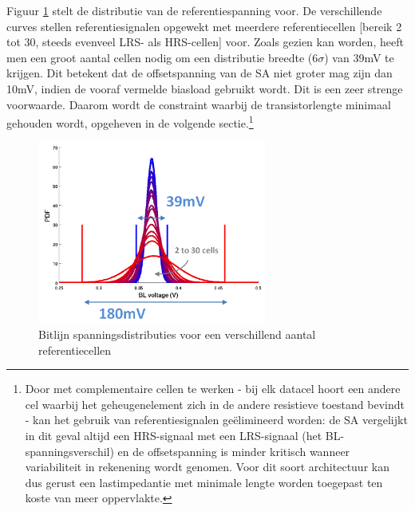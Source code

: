 Figuur \ref{fig:distref} stelt de distributie van de referentiespanning voor. De verschillende curves stellen referentiesignalen opgewekt met meerdere referentiecellen [bereik 2 tot 30, steeds evenveel LRS- als HRS-cellen] voor. Zoals gezien kan worden, heeft men een groot aantal cellen nodig om een distributie breedte (6$\sigma$) van 39mV te krijgen. Dit betekent dat de offsetspanning van de SA niet groter mag zijn dan 10mV, indien de vooraf vermelde biasload gebruikt wordt. Dit is een zeer strenge voorwaarde. Daarom wordt de constraint waarbij de transistorlengte minimaal gehouden wordt, opgeheven in de volgende sectie.\footnote{Door met complementaire cellen te werken - bij elk datacel hoort een andere cel waarbij het geheugenelement zich in de andere resistieve toestand bevindt - kan het gebruik van referentiesignalen geëlimineerd worden: de SA vergelijkt in dit geval altijd een HRS-signaal met een LRS-signaal (het BL-spanningsverschil) en de offsetspanning is minder kritisch wanneer variabiliteit in rekenening wordt genomen. Voor dit soort architectuur kan dus gerust een lastimpedantie met minimale lengte worden toegepast ten koste van meer oppervlakte.}

\begin{figure}[!ht]
  \centering
  \includegraphics[width=0.67\textwidth]{../fig/hfdst-last-ref.png}
  \caption[Bitlijnspanning referentiecellen]{Bitlijn spanningsdistributies voor een verschillend aantal referentiecellen}
  \label{fig:distref}
\end{figure}



